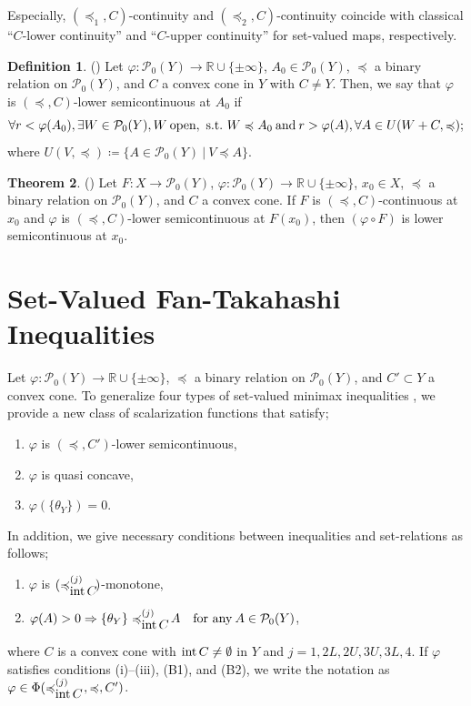 \documentclass[a4paper,11pt]{jsarticle}
\theoremstyle{definition}
\newtheorem{dfn}{Definition}[section]
\newtheorem{thm}[dfn]{Theorem}
\newcommand{\rnum}{\mathbb{R}}
\newcommand{\RealNumberSet}{\mathbb{R}}
\newcommand{\Interior}[1]{\mbox{\rm int}\mbox{$\,#1$}}
\newcommand{\pow}[1]{\mathcal{P}_{0}(#1)}
\newcommand{\SetForm}[2]{
  \{{#1}\:|\:{#2}\}
}
\newcommand{\setrel}[2]{\preccurlyeq^{(#1)}_{#2}\!}
\newcommand{\st}{\ \mathrm{s.t.}\ }
\begin{document}
Especially, $(\preccurlyeq_1, C)$-continuity and $(\preccurlyeq_2, C)$-continuity coincide with classical “$C$-lower
continuity” and “$C$-upper continuity” for set-valued maps, respectively.

\begin{dfn}{(\cite{DechboonTanaka2024})}
  Let $\varphi \colon \pow{Y} \to \RealNumberSet \cup \{\pm \infty\}$, $A_0 \in \pow{Y}$,
  $\preccurlyeq$ a binary relation on $\pow{Y}$, and $C$ a convex cone in $Y$ with $C \ne Y$. Then,
  we say that $\varphi$ is $(\preccurlyeq, C)$-lower semicontinuous at $A_0$ if
  \begin{equation}
    \forall r < \varphi (A_0), \exists W \in \pow{Y}, W\:\text{open}, \st W \preccurlyeq A_0 \:\text{and}\:
    r > \varphi (A), \forall A \in U(W + C, \preccurlyeq); \notag
  \end{equation}
  where $U(V,\preccurlyeq) \coloneqq \SetForm{A \in \pow{Y}}{V \preccurlyeq A}$.
\end{dfn}

\begin{thm}{(\cite{DechboonTanaka2024})}
  Let $F \colon X \to \pow{Y}$, $\varphi \colon \pow{Y} \to \RealNumberSet \cup \{\pm \infty\}$, $x_0 \in X$,
  $\preccurlyeq$ a binary relation on $\pow{Y}$, and $C$ a convex cone. If $F$ is $(\preccurlyeq, C)$-continuous at $x_0$
  and $\varphi$ is $(\preccurlyeq, C)$-lower semicontinuous at $F(x_0)$, then $(\varphi \circ F)$ is lower semicontinuous at $x_0$.
\end{thm}

\section{\rm Set-Valued Fan-Takahashi Inequalities}

Let $\varphi: \pow{Y} \to \rnum \cup \{\pm \infty\}$, $\preccurlyeq$ a binary relation
on $\pow{Y}$, and $C' \subset Y$  a convex cone.
To generalize four types of set-valued minimax inequalities \cite{KuwanoTanakaYamada2010},
we provide a new class of scalarization functions that satisfy;
\begin{enumerate}
  \item $\varphi$ is $(\preccurlyeq, C')$-lower semicontinuous,
  \item $\varphi$ is quasi concave,
  \item $\varphi(\{\theta_{Y}\}) = 0$.
\end{enumerate}
In addition, we give necessary conditions between inequalities and set-relations as follows;
\begin{enumerate}[label=(B\arabic*)]
  \item $\varphi$ is $(\setrel{j}{\Interior{C}})$-monotone,
  \item $\varphi (A) > 0 \Rightarrow  \{\theta_Y\} \setrel{j}{\Interior{C}} A \quad\text{for any}\:A\in \pow{Y}$,
\end{enumerate}
where $C$ is a convex cone with $\Interior{C} \ne \emptyset$ in $Y$ and $j= 1, 2L, 2U, 3U, 3L, 4$.
If $\varphi$ satisfies conditions (i)--(iii), (B1), and (B2),
we write the notation as $\varphi \in \Phi(\setrel{j}{\Interior{C}}\:, \preccurlyeq, C')$.
\end{document}

